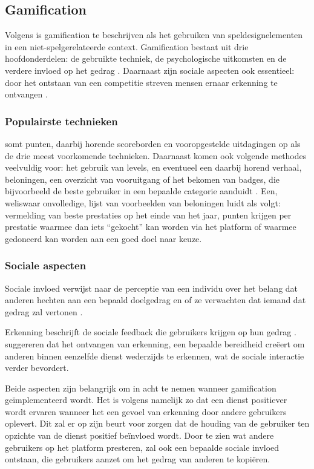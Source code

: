\subsection{Gamification}

Volgens \textcite{Deterding2011} is gamification te beschrijven als het gebruiken van speldesignelementen in een niet-spelgerelateerde context. Gamification bestaat uit drie hoofdonderdelen: de gebruikte techniek, de psychologische uitkomsten en de verdere invloed op het gedrag \autocite{Hamari2014}. Daarnaast zijn sociale aspecten ook essentieel: door het ontstaan van een competitie streven mensen ernaar erkenning te ontvangen \autocite{Hamari2013}.

\subsubsection{Populairste technieken}
\textcite{Hamari2014} somt punten, daarbij horende scoreborden en vooropgestelde uitdagingen op als de drie meest voorkomende technieken. Daarnaast komen ook volgende methodes veelvuldig voor: het gebruik van levels, en eventueel een daarbij horend verhaal, beloningen, een overzicht van vooruitgang of het bekomen van badges, die bijvoorbeeld de beste gebruiker in een bepaalde categorie aanduidt \autocite{Dong2012,Flatla2011,Li2012}. Een, weliswaar onvolledige, lijst van voorbeelden van beloningen luidt als volgt: vermelding van beste prestaties op het einde van het jaar, punten krijgen per prestatie waarmee dan iets ``gekocht'' kan worden via het platform of waarmee gedoneerd kan worden aan een goed doel naar keuze.

\subsubsection{Sociale aspecten}
Sociale invloed verwijst naar de perceptie van een individu over het belang dat anderen hechten aan een bepaald doelgedrag en of ze verwachten dat iemand dat gedrag zal vertonen \autocite{Ajzen1991}.

Erkenning beschrijft de sociale feedback die gebruikers krijgen op hun gedrag \autocite{Cheung2011}. \textcite{Hamari2013} suggereren dat het ontvangen van erkenning, een bepaalde bereidheid creëert om anderen binnen eenzelfde dienst wederzijds te erkennen, wat de sociale interactie verder bevordert.

Beide aspecten zijn belangrijk om in acht te nemen wanneer gamification geïmplementeerd wordt. Het is volgens \textcite{Preece2001} namelijk zo dat een dienst positiever wordt ervaren wanneer het een gevoel van erkenning door andere gebruikers oplevert. Dit zal er op zijn beurt voor zorgen dat de houding van de gebruiker ten opzichte van de dienst positief beïnvloed wordt. Door te zien wat andere gebruikers op het platform presteren, zal ook een bepaalde sociale invloed ontstaan, die gebruikers aanzet om het gedrag van anderen te kopiëren.

